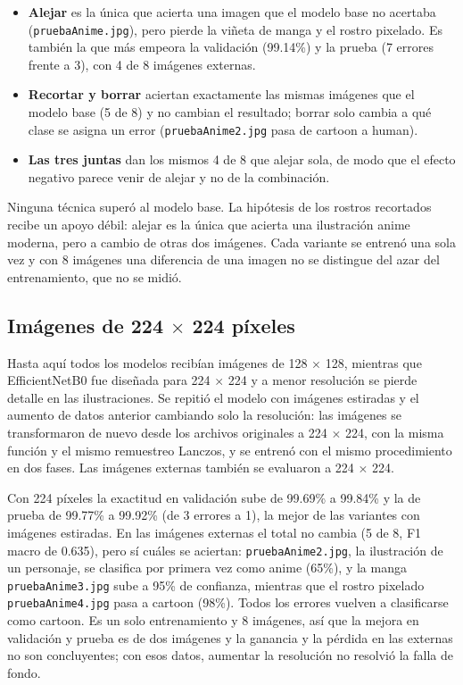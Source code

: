 \documentclass[letterpaper, 10 pt]{IEEEconf}
\begin{document}
\begin{itemize}
    \item \textbf{Alejar} es la única que acierta una imagen que el modelo base no acertaba (\texttt{pruebaAnime.jpg}), pero pierde la viñeta de manga y el rostro pixelado. Es también la que más empeora la validación (99.14\%) y la prueba (7 errores frente a 3), con 4 de 8 imágenes externas.
    \item \textbf{Recortar y borrar} aciertan exactamente las mismas imágenes que el modelo base (5 de 8) y no cambian el resultado; borrar solo cambia a qué clase se asigna un error (\texttt{pruebaAnime2.jpg} pasa de cartoon a human).
    \item \textbf{Las tres juntas} dan los mismos 4 de 8 que alejar sola, de modo que el efecto negativo parece venir de alejar y no de la combinación.
\end{itemize}

Ninguna técnica superó al modelo base. La hipótesis de los rostros recortados recibe un apoyo débil: alejar es la única que acierta una ilustración anime moderna, pero a cambio de otras dos imágenes. Cada variante se entrenó una sola vez y con 8 imágenes una diferencia de una imagen no se distingue del azar del entrenamiento, que no se midió.

\subsection{Imágenes de 224 $\times$ 224 píxeles}

Hasta aquí todos los modelos recibían imágenes de 128 $\times$ 128, mientras que EfficientNetB0 fue diseñada para 224 $\times$ 224 y a menor resolución se pierde detalle en las ilustraciones. Se repitió el modelo con imágenes estiradas y el aumento de datos anterior cambiando solo la resolución: las imágenes se transformaron de nuevo desde los archivos originales a 224 $\times$ 224, con la misma función y el mismo remuestreo Lanczos, y se entrenó con el mismo procedimiento en dos fases. Las imágenes externas también se evaluaron a 224 $\times$ 224.

Con 224 píxeles la exactitud en validación sube de 99.69\% a 99.84\% y la de prueba de 99.77\% a 99.92\% (de 3 errores a 1), la mejor de las variantes con imágenes estiradas. En las imágenes externas el total no cambia (5 de 8, F1 macro de 0.635), pero sí cuáles se aciertan: \texttt{pruebaAnime2.jpg}, la ilustración de un personaje, se clasifica por primera vez como anime (65\%), y la manga \texttt{pruebaAnime3.jpg} sube a 95\% de confianza, mientras que el rostro pixelado \texttt{pruebaAnime4.jpg} pasa a cartoon (98\%). Todos los errores vuelven a clasificarse como cartoon. Es un solo entrenamiento y 8 imágenes, así que la mejora en validación y prueba es de dos imágenes y la ganancia y la pérdida en las externas no son concluyentes; con esos datos, aumentar la resolución no resolvió la falla de fondo.
\end{document}
